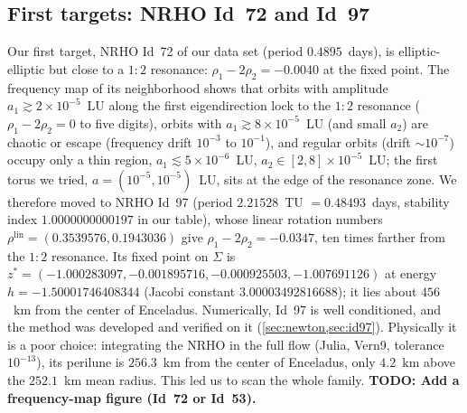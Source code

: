 \documentclass[11pt]{article}
\newcommand{\todo}[1]{\textbf{TODO: #1}}
\begin{document}
\subsection{First targets: NRHO Id~72 and Id~97}\label{sec:choice}
Our first target, NRHO Id~72 of our data set (period $0.4895$~days), is elliptic-elliptic but
close to a $1{:}2$ resonance: $\rho_1-2\rho_2 = -0.0040$ at the fixed point. The frequency map of
its neighborhood shows that orbits with amplitude $a_1\gtrsim2\times10^{-5}$~LU along the first
eigendirection lock to the $1{:}2$ resonance ($\rho_1-2\rho_2=0$ to five digits), orbits with
$a_1\gtrsim 8\times10^{-5}$~LU (and small $a_2$) are chaotic or escape (frequency drift
$10^{-3}$ to $10^{-1}$), and regular orbits (drift $\sim10^{-7}$) occupy only a thin region,
$a_1\lesssim5\times10^{-6}$~LU, $a_2\in[2,8]\times10^{-5}$~LU; the first torus we tried,
$a=(10^{-5},10^{-5})$~LU, sits at the edge of the resonance zone. We therefore moved to NRHO Id~97 (period $2.21528$~TU $=0.48493$~days, stability
index $1.0000000000197$ in our table), whose linear rotation numbers
$\rho^{\mathrm{lin}} = (0.3539576, 0.1943036)$ give $\rho_1-2\rho_2 = -0.0347$, ten times
farther from the $1{:}2$ resonance. Its fixed point on $\Sigma$ is
$z^* = (-1.000283097, -0.001895716, -0.000925503, -1.007691126)$ at energy
$h = -1.50001746408344$ (Jacobi constant $3.00003492816688$); it lies about $456$~km from the center
of Enceladus. Numerically, Id~97 is well conditioned, and the method was developed and verified
on it (\cref{sec:newton,sec:id97}). Physically it is a poor choice: integrating the NRHO in the
full flow (Julia, Vern9, tolerance $10^{-13}$), its perilune is $256.3$~km from the center of
Enceladus, only $4.2$~km above the $252.1$~km mean radius. This led us to scan the whole family.
\todo{Add a frequency-map figure (Id~72 or Id~53).}
\end{document}
